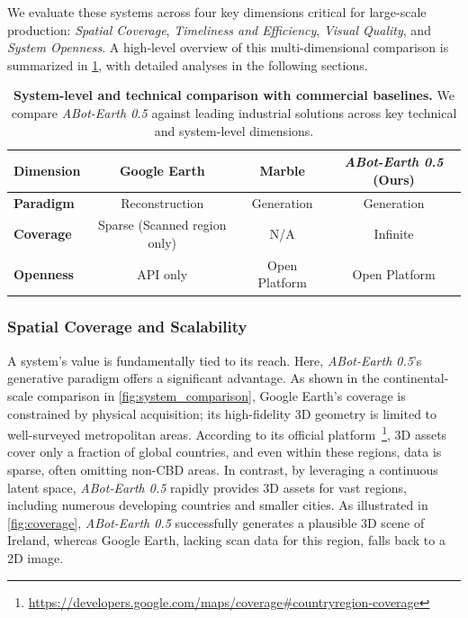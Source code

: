 \documentclass{llmxive}
\providecommand{\method}{\textit{ABot-Earth 0.5}\xspace}
\begin{document}
We evaluate these systems across four key dimensions critical for large-scale production: \textit{Spatial Coverage}, \textit{Timeliness and Efficiency}, \textit{Visual Quality}, and \textit{System Openness}. A high-level overview of this multi-dimensional comparison is summarized in \cref{tab:system_comparison_merged}, with detailed analyses in the following sections.

\begin{table}[t]
\centering
\small
\begin{tabular}{l ccc}
\toprule
\textbf{Dimension} & \textbf{Google Earth} & \textbf{Marble} & \textbf{\method{} (Ours)} \\
\midrule
\textbf{Paradigm} & Reconstruction & Generation & {Generation} \\
\textbf{Coverage} & Sparse (Scanned region only) & N/A & {Infinite} \\
\textbf{Openness} & API only & Open Platform & {Open Platform} \\
\bottomrule
\end{tabular}
\caption{\textbf{System-level and technical comparison with commercial baselines.} We compare \method{} against leading industrial solutions across key technical and system-level dimensions.}
\label{tab:system_comparison_merged}
\end{table}

\subsubsection{Spatial Coverage and Scalability}
A system's value is fundamentally tied to its reach. Here, \method{}'s generative paradigm offers a significant advantage. As shown in the continental-scale comparison in \cref{fig:system_comparison}, Google Earth's coverage is constrained by physical acquisition; its high-fidelity 3D geometry is limited to well-surveyed metropolitan areas. According to its official platform~\footnote{\url{https://developers.google.com/maps/coverage\#countryregion-coverage}}, 3D assets cover only a fraction of global countries, and even within these regions, data is sparse, often omitting non-CBD areas. In contrast, by leveraging a continuous latent space, \method{} rapidly provides 3D assets for vast regions, including numerous developing countries and smaller cities. As illustrated in \cref{fig:coverage}, \method{} successfully generates a plausible 3D scene of Ireland, whereas Google Earth, lacking scan data for this region, falls back to a 2D image.
\end{document}
